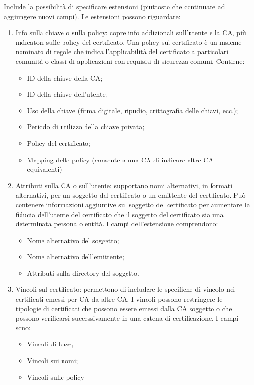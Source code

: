 Include la possibilità di specificare estensioni (piuttosto che continuare ad aggiungere nuovi campi). Le estensioni possono riguardare:
\begin{enumerate}
    \item Info sulla chiave o sulla policy: copre info addizionali sull'utente e la CA, più indicatori sulle policy del certificato. Una policy sul certificato è un insieme nominato di regole che indica l'applicabilità del certificato a particolari comunità o classi di applicazioni con requisiti di sicurezza comuni. Contiene:
	\begin{itemize}
	    \item ID della chiave della CA;
		\item ID della chiave dell'utente;
		\item Uso della chiave (firma digitale, ripudio, crittografia delle chiavi, ecc.);
		\item Periodo di utilizzo della chiave privata;
		\item Policy del certificato;
		\item Mapping delle policy (consente a una CA di indicare altre CA equivalenti).
	\end{itemize}
		
	\item Attributi sulla CA o sull'utente: supportano nomi alternativi, in formati alternativi, per un soggetto del certificato o un emittente del certificato. Può contenere informazioni aggiuntive sul soggetto del certificato per aumentare la fiducia dell'utente del certificato che il soggetto del certificato sia una determinata persona o entità. I campi dell'estensione comprendono:
	\begin{itemize}
	    \item Nome alternativo del soggetto;
		\item Nome alternativo dell'emittente;
		\item Attributi sulla directory del soggetto.
	\end{itemize}
		
	\item Vincoli sul certificato: permettono di includere le specifiche di vincolo nei certificati emessi per CA da altre CA. I vincoli possono restringere le tipologie di certificati che possono essere emessi dalla CA soggetto o che possono verificarsi successivamente in una catena di certificazione. I campi sono:
	\begin{itemize}
	    \item Vincoli di base;
		\item Vincoli sui nomi;
		\item Vincoli sulle policy
	\end{itemize}
\end{enumerate}

